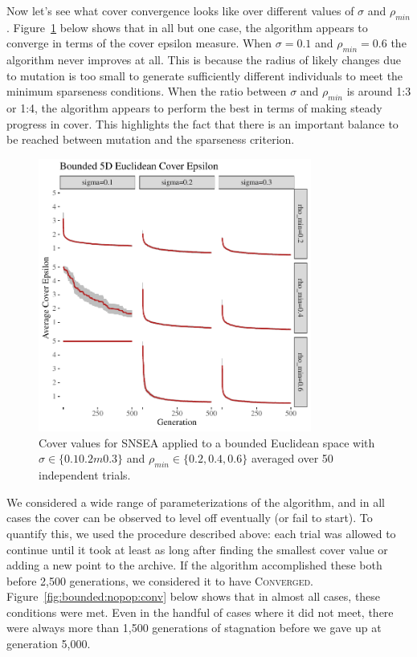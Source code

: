 \documentclass[twoside]{article}
\begin{document}
Now let's see what cover convergence looks like over different values of $\sigma$ and $\rho_{min}$.  Figure~\ref{fig:bounded:nopop:sm} below shows that in all but one case, the algorithm appears to converge in terms of the cover epsilon measure.  When $\sigma=0.1$ and $\rho_{min} = 0.6$ the algorithm never improves at all.  This is because the radius of likely changes due to mutation is too small to generate sufficiently different individuals to meet the minimum sparseness conditions.  When the ratio between $\sigma$ and $\rho_{min}$ is around 1:3 or 1:4, the algorithm appears to perform the best in terms of making steady progress in cover.  This highlights the fact that there is an important balance to be reached between mutation and the sparseness criterion.
%
\begin{figure}[t]
  \center\includegraphics[width=0.8\textwidth]{Figures/bounded-500sm-NOPOP.pdf}
  \caption{\label{fig:bounded:nopop:sm} Cover values for SNSEA applied to a bounded Euclidean space with $\sigma\in\{0.1  0.2m 0.3\}$ and $\rho_{min} \in \{0.2, 0.4, 0.6\}$ averaged over 50 independent trials.}
\end{figure}
%
We considered a wide range of parameterizations of the algorithm, and in all cases the cover can be observed to level off eventually (or fail to start).  To quantify this, we used the procedure described above:  each trial was allowed to continue until it took at least as long after finding the smallest cover value or adding a new point to the archive.  If the algorithm accomplished these both before 2,500 generations, we considered it to have \textsc{Converged}.  Figure~\ref{fig:bounded:nopop:conv} below shows that in almost all cases, these conditions were met.  Even in the handful of cases where it did not meet, there were always more than 1,500 generations of stagnation before we gave up at generation 5,000.  
\end{document}
